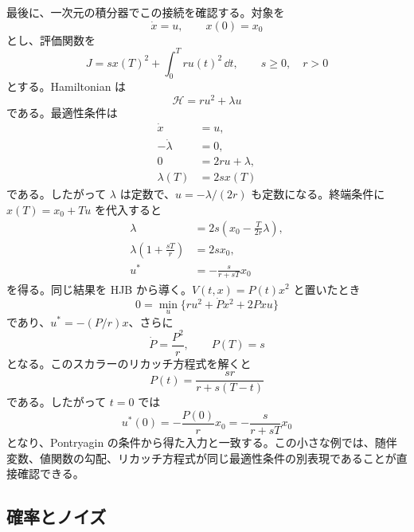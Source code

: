 最後に、一次元の積分器でこの接続を確認する。対象を
\begin{equation}
  \dot{x}=u,
  \qquad x(0)=x_0
\end{equation}
とし、評価関数を
\begin{equation}
  J=sx(T)^2+\int_0^T r u(t)^2\,\dd t,
  \qquad s\ge0,\quad r>0
  \label{eq:scalar-integrator-cost}
\end{equation}
とする。Hamiltonian は
\begin{equation}
  \mathcal{H}=r u^2+\lambda u
\end{equation}
である。最適性条件は
\begin{align}
  \dot{x}&=u,\\
  -\dot{\lambda}&=0,\\
  0&=2ru+\lambda,\\
  \lambda(T)&=2s x(T)
\end{align}
である。したがって $\lambda$ は定数で、$u=-\lambda/(2r)$ も定数になる。終端条件に $x(T)=x_0+Tu$ を代入すると
\begin{align}
  \lambda
  &=2s\left(x_0-\frac{T}{2r}\lambda\right),\\
  \lambda\left(1+\frac{sT}{r}\right)&=2s x_0,\\
  u^*&=-\frac{s}{r+sT}x_0
\end{align}
を得る。同じ結果を HJB から導く。$V(t,x)=P(t)x^2$ と置いたとき
\begin{equation}
  0=\min_u\{r u^2+\dot{P}x^2+2P xu\}
\end{equation}
であり、$u^*=-(P/r)x$、さらに
\begin{equation}
  \dot{P}=\frac{P^2}{r},
  \qquad
  P(T)=s
\end{equation}
となる。このスカラーのリカッチ方程式を解くと
\begin{equation}
  P(t)=\frac{sr}{r+s(T-t)}
  \label{eq:scalar-riccati-solution}
\end{equation}
である。したがって $t=0$ では
\begin{equation}
  u^*(0)=-\frac{P(0)}{r}x_0
  =-\frac{s}{r+sT}x_0
\end{equation}
となり、Pontryagin の条件から得た入力と一致する。この小さな例では、随伴変数、値関数の勾配、リカッチ方程式が同じ最適性条件の別表現であることが直接確認できる。

\subsection{確率とノイズ}

